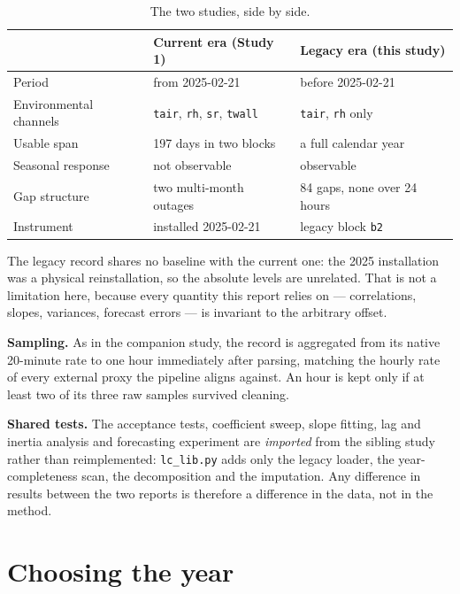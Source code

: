 \documentclass[11pt,a4paper]{article}
\begin{document}
\begin{table}[H]
\centering
\caption{The two studies, side by side.}
\begin{tabularx}{\linewidth}{@{}L{4.2cm} Y Y@{}}
\toprule
& \textbf{Current era (Study 1)} & \textbf{Legacy era (this study)}\\
\midrule
Period & from 2025-02-21 & before 2025-02-21\\
Environmental channels & \texttt{tair}, \texttt{rh}, \texttt{sr}, \texttt{twall} & \texttt{tair}, \texttt{rh} only\\
Usable span & 197 days in two blocks & a full calendar year\\
Seasonal response & not observable & observable\\
Gap structure & two multi-month outages & 84 gaps, none over 24 hours\\
Instrument & installed 2025-02-21 & legacy block \texttt{b2}\\
\bottomrule
\end{tabularx}
\end{table}

The legacy record shares no baseline with the current one: the 2025 installation was a
physical reinstallation, so the absolute levels are unrelated. That is not a limitation
here, because every quantity this report relies on --- correlations, slopes, variances,
forecast errors --- is invariant to the arbitrary offset.

\medskip
\noindent\textbf{Sampling.} As in the companion study, the record is aggregated from its
native 20-minute rate to one hour immediately after parsing, matching the hourly rate of
every external proxy the pipeline aligns against. An hour is kept only if at least two
of its three raw samples survived cleaning.

\medskip
\noindent\textbf{Shared tests.} The acceptance tests, coefficient sweep, slope fitting,
lag and inertia analysis and forecasting experiment are \emph{imported} from the sibling
study rather than reimplemented: \texttt{lc\_lib.py} adds only the legacy loader, the
year-completeness scan, the decomposition and the imputation. Any difference in results
between the two reports is therefore a difference in the data, not in the method.

\section{Choosing the year}
\end{document}
